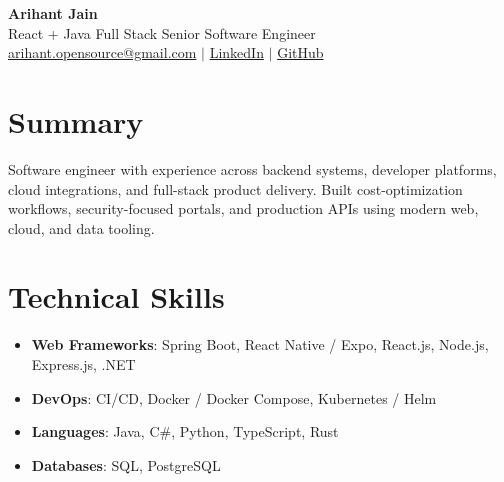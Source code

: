 \documentclass[11pt,a4paper]{article}
\begin{document}
\begin{center}
{\LARGE \textbf{Arihant Jain}}
\\ React + Java Full Stack Senior Software Engineer
\\ \href{mailto:arihant.opensource@gmail.com}{arihant.opensource@gmail.com} $\mid$ \href{https://linkedin.com/in/arihantjain1208}{LinkedIn} $\mid$ \href{https://github.com/Arihant1208}{GitHub}
\end{center}

\section{Summary}
Software engineer with experience across backend systems, developer platforms, cloud integrations, and full-stack product delivery. Built cost-optimization workflows, security-focused portals, and production APIs using modern web, cloud, and data tooling.

\section{Technical Skills}
\begin{itemize}
  \item \textbf{Web Frameworks}: Spring Boot, React Native / Expo, React.js, Node.js, Express.js, .NET
  \item \textbf{DevOps}: CI/CD, Docker / Docker Compose, Kubernetes / Helm
  \item \textbf{Languages}: Java, C\#, Python, TypeScript, Rust
  \item \textbf{Databases}: SQL, PostgreSQL
\end{itemize}
\end{document}
